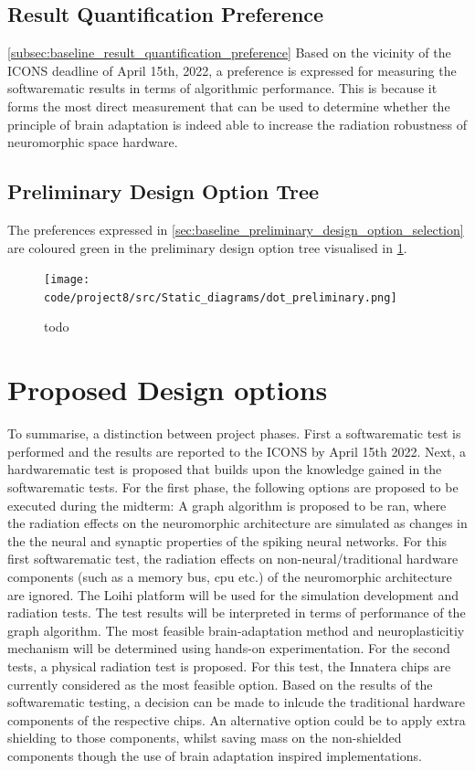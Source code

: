 \subsection{Result Quantification Preference}\cref{subsec:baseline_result_quantification_preference}
Based on the vicinity of the ICONS deadline of April 15th, 2022, a preference is expressed for measuring the softwarematic results in terms of algorithmic performance. This is because it forms the most direct measurement that can be used to determine whether the principle of brain adaptation is indeed able to increase the radiation robustness of neuromorphic space hardware.

\subsection{Preliminary Design Option Tree}\label{subsec:preliminary_design_option_tree}
The preferences expressed in \cref{sec:baseline_preliminary_design_option_selection} are coloured green in the preliminary design option tree visualised in \cref{fig:baseline_preliminary_dot}.

\begin{figure}[H]
    \centering
    \texttt{[image: code/project8/src/Static\_diagrams/dot\_preliminary.png]}
    \caption{todo}
    \label{fig:baseline_preliminary_dot}
\end{figure}

\section{Proposed Design options}\label{subsec:baseline_proposed_design options.}
To summarise, a distinction between project phases. First a softwarematic test is performed and the results are reported to the ICONS by  April 15th 2022. Next, a hardwarematic test is proposed that builds upon the knowledge gained in the softwarematic tests. For the first phase, the following options are proposed to be executed during the midterm: A graph algorithm is proposed to be ran, where the radiation effects on the neuromorphic architecture are simulated as changes in the the neural and synaptic properties of the spiking neural networks. For this first softwarematic test, the radiation effects on non-neural/traditional hardware components (such as a memory bus, \acrshort{cpu} etc.) of the neuromorphic architecture are ignored. The Loihi platform will be used for the simulation development and radiation tests. The test results will be interpreted in terms of performance of the graph algorithm. The most feasible brain-adaptation method and neuroplasticitiy mechanism will be determined using hands-on experimentation.
For the second tests, a physical radiation test is proposed. For this test, the Innatera chips are currently considered as the most feasible option. Based on the results of the softwarematic testing, a decision can be made to inlcude the traditional hardware components of the respective chips. An alternative option could be to apply extra shielding to those components, whilst saving mass on the non-shielded components though the use of brain adaptation inspired implementations.
